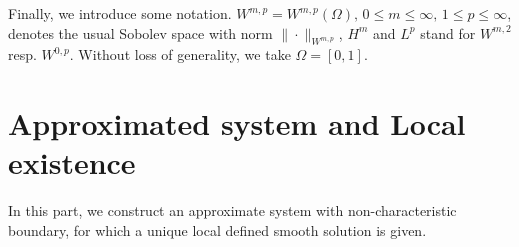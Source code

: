 \documentclass[10pt,reqno]{amsart}
\numberwithin{equation}{section}
\newcommand{\re}[1]{\textcolor{red}{#1}}
\begin{document}
Finally, we introduce some notation.  $W^{m,p}=W^{m,p}( \Omega),\,0\le m\le
\infty,\,1 \le p\le \infty$, denotes the usual Sobolev space with norm $\|
\cdot \|_{W^{m,p}}$, $H^m$ and $L^p$
stand for $W^{m,2}$ resp. $W^{0,p}$. Without loss of generality, we take $\Omega=[0, 1]$.

\section{Approximated system and Local existence}
In this part, we construct an approximate system with non-characteristic boundary, for which a unique local defined smooth solution is given.

\end{document}
